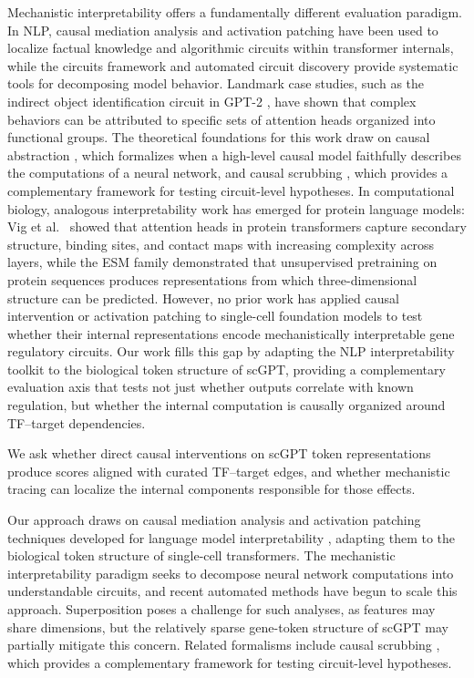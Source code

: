 \documentclass[10pt,letterpaper]{article}
\begin{document}
Mechanistic interpretability offers a fundamentally different evaluation
paradigm. In NLP, causal mediation analysis \cite{vig_causal_mediation_2020}
and activation patching \cite{meng_rome_2022,goldowsky_dill_path_patching_2023}
have been used to localize factual knowledge and algorithmic circuits within
transformer internals, while the circuits framework
\cite{olah_zoom_in_2020,elhage_framework_2021} and automated circuit
discovery \cite{conmy_acdc_2023} provide systematic tools for decomposing
model behavior. Landmark case studies, such as the indirect object
identification circuit in GPT-2 \cite{wang_ioi_2023}, have shown that complex
behaviors can be attributed to specific sets of attention heads organized into
functional groups. The theoretical foundations for this work draw on causal
abstraction \cite{geiger_causal_abstraction_2021}, which formalizes when a
high-level causal model faithfully describes the computations of a neural
network, and causal scrubbing \cite{chan_causal_scrubbing_2022}, which provides
a complementary framework for testing circuit-level hypotheses. In
computational biology, analogous interpretability work has emerged for protein
language models: Vig et al.\ \cite{vig_bertology_biology_2021} showed that
attention heads in protein transformers capture secondary structure, binding
sites, and contact maps with increasing complexity across layers, while the
ESM family \cite{rives_esm_2021,lin_esmfold_2023} demonstrated that
unsupervised pretraining on protein sequences produces representations from
which three-dimensional structure can be predicted. However, no prior work
has applied causal intervention or activation patching to single-cell
foundation models to test whether their internal representations encode
mechanistically interpretable gene regulatory circuits. Our work fills this
gap by adapting the NLP interpretability toolkit to the biological token
structure of scGPT, providing a complementary evaluation axis that tests not
just whether outputs correlate with known regulation, but whether the internal
computation is causally organized around TF--target dependencies.

We ask whether direct causal interventions on scGPT token
representations produce scores aligned with curated TF--target edges, and
whether mechanistic tracing can localize the internal components responsible
for those effects.

Our approach draws on causal mediation analysis
\cite{vig_causal_mediation_2020} and activation patching techniques developed
for language model interpretability
\cite{meng_rome_2022,goldowsky_dill_path_patching_2023}, adapting them to the
biological token structure of single-cell transformers. The mechanistic
interpretability paradigm \cite{olah_zoom_in_2020} seeks to decompose neural
network computations into understandable circuits, and recent automated methods
\cite{conmy_acdc_2023} have begun to scale this approach. Superposition
\cite{elhage_superposition_2022} poses a challenge for such analyses, as
features may share dimensions, but the relatively sparse gene-token structure
of scGPT may partially mitigate this concern. Related formalisms include causal
scrubbing \cite{chan_causal_scrubbing_2022}, which provides a complementary
framework for testing circuit-level hypotheses.
\end{document}
